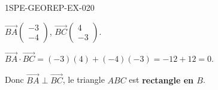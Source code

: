 \begin{corrige}{1SPE-GEOREP-EX-020}


$\vec{BA}\begin{pmatrix} -3 \\ -4 \end{pmatrix}$, $\vec{BC}\begin{pmatrix} 4 \\ -3 \end{pmatrix}$.

$\vec{BA} \cdot \vec{BC} = (-3)(4) + (-4)(-3) = -12 + 12 = 0$.

Donc $\vec{BA} \perp \vec{BC}$, le triangle $ABC$ est \textbf{rectangle en $B$}.

\end{corrige}
